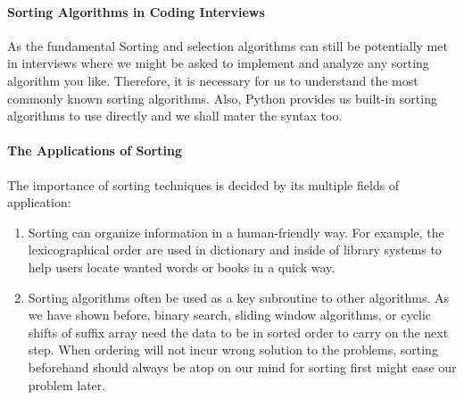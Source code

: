 \documentclass[../main.tex]{subfiles}
\begin{document}
\paragraph{Sorting Algorithms in Coding Interviews}  As the fundamental Sorting and selection algorithms can still be potentially met in interviews where we might be asked to implement and analyze any sorting algorithm you like. Therefore, it is necessary for us to understand the most commonly known sorting algorithms. Also, Python provides us built-in sorting algorithms to use directly and we shall mater the syntax too.

\paragraph{The Applications of Sorting} The importance of sorting techniques is decided by its multiple fields of application:
\begin{enumerate}
    \item Sorting can organize information in a human-friendly way. For example, the lexicographical order are used in dictionary and inside of library systems to help users locate wanted words or books in a quick way. 
    \item Sorting algorithms often be used as a key subroutine to other algorithms. As we have shown before, binary search, sliding window algorithms, or cyclic shifts of suffix array need the data to be in sorted order to carry on the next step. When ordering will not incur wrong solution to the problems, sorting beforehand should always be atop on our mind for sorting first might ease our problem later. 
\end{enumerate}
\end{document}
